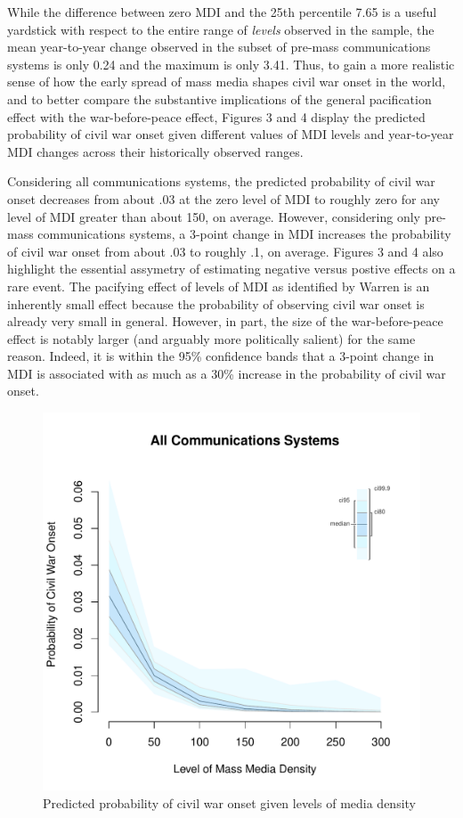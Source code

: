 \documentclass[11pt,article,oneside]{memoir}
\makeatletter
\def\maxwidth{\ifdim\Gin@nat@width>\linewidth\linewidth
\else\Gin@nat@width\fi}
\let\Oldincludegraphics\includegraphics
\renewcommand{\includegraphics}[1]{\Oldincludegraphics[width=\maxwidth]{#1}}
\makeatother
\begin{document}
While the difference between zero MDI and the 25th percentile 7.65 is a
useful yardstick with respect to the entire range of \emph{levels}
observed in the sample, the mean year-to-year change observed in the
subset of pre-mass communications systems is only 0.24 and the maximum
is only 3.41. Thus, to gain a more realistic sense of how the early
spread of mass media shapes civil war onset in the world, and to better
compare the substantive implications of the general pacification effect
with the war-before-peace effect, Figures 3 and 4 display the predicted
probability of civil war onset given different values of MDI levels and
year-to-year MDI changes across their historically observed ranges.

Considering all communications systems, the predicted probability of
civil war onset decreases from about .03 at the zero level of MDI to
roughly zero for any level of MDI greater than about 150, on average.
However, considering only pre-mass communications systems, a 3-point
change in MDI increases the probability of civil war onset from about
.03 to roughly .1, on average. Figures 3 and 4 also highlight the
essential assymetry of estimating negative versus postive effects on a
rare event. The pacifying effect of levels of MDI as identified by
Warren is an inherently small effect because the probability of
observing civil war onset is already very small in general. However, in
part, the size of the war-before-peace effect is notably larger (and
arguably more politically salient) for the same reason. Indeed, it is
within the 95\% confidence bands that a 3-point change in MDI is
associated with as much as a 30\% increase in the probability of civil
war onset.

\clearpage

\begin{figure} 
\includegraphics{figure/mdi_effect.pdf} 
\caption{Predicted probability of civil war onset given levels of media density} 
\label{myFigur} 
\end{figure}
\end{document}
